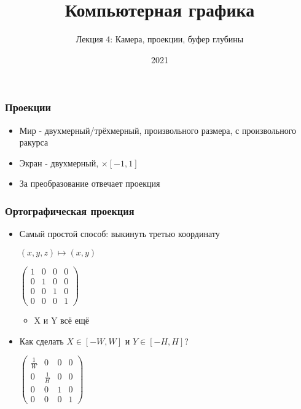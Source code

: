 \documentclass{beamer}
\title{Компьютерная графика}
\subtitle{Лекция 4: Камера, проекции, буфер глубины}
\date{2021}
\begin{document}
\frame{\titlepage}

\begin{frame}[fragile]
\frametitle{Проекции}
\begin{itemize}
\item Мир - двухмерный/трёхмерный, произвольного размера, с произвольного ракурса
\pause
\item Экран - двухмерный, \begin{math}[-1, 1] \times [-1, 1]\end{math}
\pause
\item За преобразование отвечает проекция
\end{itemize}
\end{frame}

\begin{frame}[fragile]
\frametitle{Ортографическая проекция}
\begin{itemize}
\item Самый простой способ: \pause выкинуть третью координату
\begin{center}\begin{math}(x, y, z) \mapsto (x, y)\end{math}\end{center}
\begin{center}
\begin{math}
\begin{pmatrix}
1 & 0 & 0 & 0 \\
0 & 1 & 0 & 0 \\
0 & 0 & 1 & 0 \\
0 & 0 & 0 & 1
\end{pmatrix}
\end{math}
\end{center}
\pause
\begin{itemize}
\item X и Y всё ещё \begin{math}[-1, 1]\end{math}
\end{itemize}
\pause
\item Как сделать \begin{math}X \in [-W, W]\end{math} и \begin{math}Y \in [-H, H]\end{math}?
\pause
\begin{center}
\begin{math}
\begin{pmatrix}
\frac{1}{W} & 0 & 0 & 0 \\
0 & \frac{1}{H} & 0 & 0 \\
0 & 0 & 1 & 0 \\
0 & 0 & 0 & 1
\end{pmatrix}
\end{math}
\end{center}
\end{itemize}
\end{frame}
\end{document}
